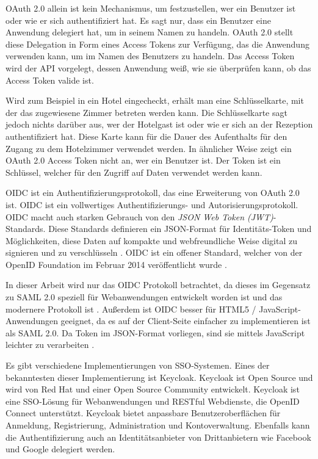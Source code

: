 OAuth 2.0 allein ist kein Mechanismus, um festzustellen, wer ein Benutzer ist oder wie er sich authentifiziert hat. Es sagt nur, dass ein Benutzer eine Anwendung delegiert hat, um in seinem Namen zu handeln. OAuth 2.0 stellt diese Delegation in Form eines Access Tokens zur Verfügung, das die Anwendung verwenden kann, um im Namen des Benutzers zu handeln. Das Access Token wird der API vorgelegt, dessen Anwendung weiß, wie sie überprüfen kann, ob das Access Token valide ist. \cite{SSEB_AuthorizationvsAuthentication}

Wird zum Beispiel in ein Hotel eingecheckt, erhält man eine Schlüsselkarte, mit der das zugewiesene Zimmer betreten werden kann. Die Schlüsselkarte sagt jedoch nichts darüber aus, wer der Hotelgast ist oder wie er sich an der Rezeption authentifiziert hat. Diese Karte kann für die Dauer des Aufenthalts für den Zugang zu dem Hotelzimmer verwendet werden. In ähnlicher Weise zeigt ein OAuth 2.0 Access Token nicht an, wer ein Benutzer ist. Der Token ist ein Schlüssel, welcher für den Zugriff auf Daten verwendet werden kann. \cite{SSEB_AuthorizationvsAuthentication}

OIDC ist ein Authentifizierungsprotokoll, das eine Erweiterung von OAuth 2.0 ist. OIDC ist ein vollwertiges Authentifizierungs- und Autorisierungsprotokoll. OIDC macht auch starken Gebrauch von den \textit{JSON Web Token (JWT)}-Standards. Diese Standards definieren ein JSON-Format für Identitäts-Token und Möglichkeiten, diese Daten auf kompakte und webfreundliche Weise digital zu signieren und zu verschlüsseln \cite{SSEB_ssoProtocols}. OIDC ist ein offener Standard, welcher von der OpenID Foundation im Februar 2014 veröffentlicht wurde \cite{SSEB_OAuth2inAction}.

In dieser Arbeit wird nur das OIDC Protokoll betrachtet, da dieses im Gegensatz zu SAML 2.0 speziell für Webanwendungen entwickelt worden ist und das modernere Protokoll ist \cite[OpenID Connect vs. SAML]{SSEB_keycloakDocs}. Außerdem ist OIDC besser für HTML5 / JavaScript-Anwendungen geeignet, da es auf der Client-Seite einfacher zu implementieren ist als SAML 2.0. Da Token im JSON-Format vorliegen, sind sie mittels JavaScript leichter zu verarbeiten \cite{SSEB_ssoProtocols}.

Es gibt verschiedene Implementierungen von SSO-Systemen. Eines der bekanntesten dieser Implementierung ist Keycloak. Keycloak ist Open Source und wird von Red Hat und einer Open Source Community entwickelt. Keycloak ist eine SSO-Lösung für Webanwendungen und RESTful Webdienste, die OpenID Connect unterstützt. Keycloak bietet anpassbare Benutzeroberflächen für Anmeldung, Registrierung, Administration und Kontoverwaltung. Ebenfalls kann die Authentifizierung auch an Identitätsanbieter von Drittanbietern wie Facebook und Google delegiert werden. \cite{SSEB_keycloakDocs}

